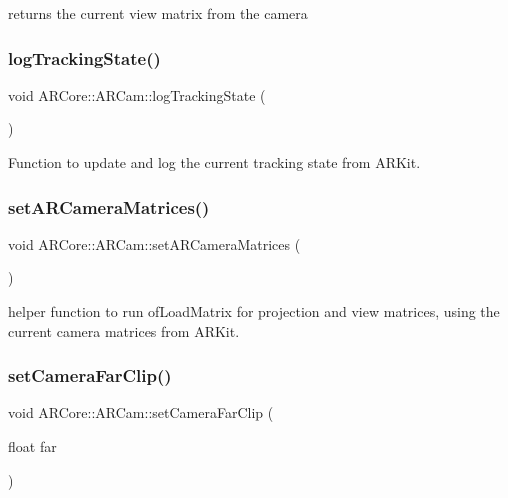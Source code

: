 returns the current view matrix from the camera 

\mbox{\label{class_a_r_core_1_1_a_r_cam_aea3513907e5805e6bffb08b7d65c0fc7}} 
\subsubsection{\texorpdfstring{log\+Tracking\+State()}{logTrackingState()}}
{\footnotesize\ttfamily void A\+R\+Core\+::\+A\+R\+Cam\+::log\+Tracking\+State (\begin{DoxyParamCaption}{ }\end{DoxyParamCaption})}



Function to update and log the current tracking state from A\+R\+Kit. 

\mbox{\label{class_a_r_core_1_1_a_r_cam_ac554b8254ea4a22f122f25542694dafa}} 
\subsubsection{\texorpdfstring{set\+A\+R\+Camera\+Matrices()}{setARCameraMatrices()}}
{\footnotesize\ttfamily void A\+R\+Core\+::\+A\+R\+Cam\+::set\+A\+R\+Camera\+Matrices (\begin{DoxyParamCaption}{ }\end{DoxyParamCaption})}

helper function to run of\+Load\+Matrix for projection and view matrices, using the current camera matrices from A\+R\+Kit. \mbox{\label{class_a_r_core_1_1_a_r_cam_aa29191b58c0e6613850916526c6ab380}} 
\subsubsection{\texorpdfstring{set\+Camera\+Far\+Clip()}{setCameraFarClip()}}
{\footnotesize\ttfamily void A\+R\+Core\+::\+A\+R\+Cam\+::set\+Camera\+Far\+Clip (\begin{DoxyParamCaption}\item[{float}]{far }\end{DoxyParamCaption})}



